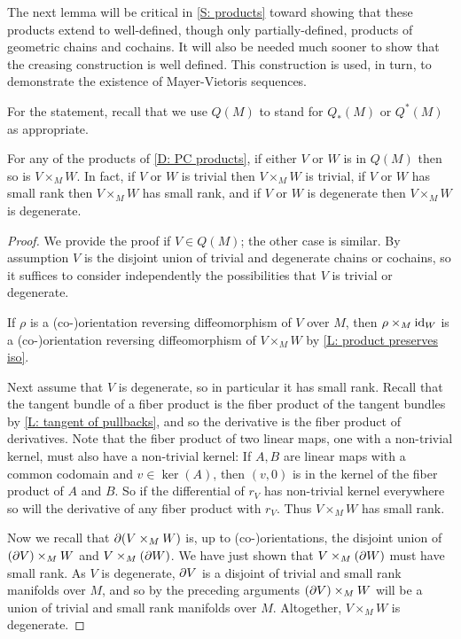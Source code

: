 The next lemma will be critical in \cref{S: products} toward showing that these products extend to well-defined, though only partially-defined, products of geometric chains and cochains.
It will also be needed much sooner to show that the creasing construction is well defined.
This construction is used, in turn, to demonstrate the existence of Mayer-Vietoris sequences.

For the statement, recall that we use $Q(M)$ to stand for $Q_*(M)$ or $Q^*(M)$ as appropriate.

\begin{lemma}\label{L: pullback with Q}
	For any of the products of \cref{D: PC products}, if either $V$ or $W$ is in $Q(M)$ then so is $V \times_M W$.
	In fact, if $V$ or $W$ is trivial then $V \times_M W$ is trivial, if $V$ or $W$ has small rank then $V \times_M W$ has small rank, and if $V$ or $W$ is degenerate then $V \times_M W$ is degenerate.
\end{lemma}

\begin{proof}
	We provide the proof if $V \in Q(M)$; the other case is similar.
	By assumption $V$ is the disjoint union of trivial and degenerate chains or cochains, so it suffices to consider independently the possibilities that $V$ is trivial or degenerate.

	If $\rho$ is a (co\nobreakdash-)orientation reversing diffeomorphism of $V$ over $M$, then $\rho \times_M \mathrm{id}_W$ is a (co\nobreakdash-)orientation reversing diffeomorphism of $V \times_M W$ by \cref{L: product preserves iso}.

	Next assume that $V$ is degenerate, so in particular it has small rank.
	Recall that the tangent bundle of a fiber product is the fiber product of the tangent bundles by \cref{L: tangent of pullbacks}, and so the derivative is the fiber product of derivatives.
	Note that the fiber product of two linear maps, one with a non-trivial kernel, must also have a non-trivial kernel: If $A,B$ are linear maps with a common codomain and $v \in \ker(A)$, then $(v,0)$ is in the kernel of the fiber product of $A$ and $B$.
	So if the differential of $r_V$ has non-trivial kernel everywhere so will the derivative of any fiber product with $r_V$.
	Thus $V \times_M W$ has small rank.

	Now we recall that $\partial(V \times_M W)$ is, up to (co\nobreakdash-)orientations, the disjoint union of $(\partial V) \times_M W$ and $V \times_M (\partial W)$.
	We have just shown that $V \times_M (\partial W)$ must have small rank.
	As $V$ is degenerate, $\partial V$ is a disjoint of trivial and small rank manifolds over $M$, and so by the preceding arguments $(\partial V) \times_M W$ will be a union of trivial and small rank manifolds over $M$.
	Altogether, $V \times_M W$ is degenerate.
\end{proof}

